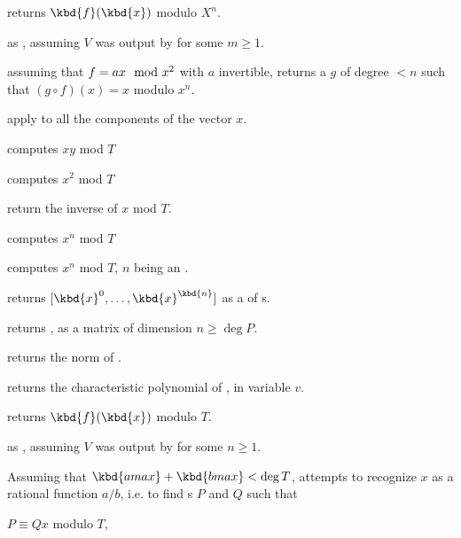 returns $\kbd{f}(\kbd{x})$ modulo
$X^n$.

 as ,
assuming $V$ was output by  for some $m\geq 1$.

 assuming that $f = a\*x \mod{x^2}$
with $a$ invertible, returns a  $g$ of degree $< n$ such that $(g
\circ f)(x) = x$ modulo $x^n$.


 apply 
to all the components of the vector $x$.


 computes $xy$ mod $T$

 computes $x^2$ mod $T$

 return the inverse of $x$ mod $T$.

 computes $x^n$ mod $T$

 computes $x^n$ mod $T$,
$n$ being an .

 returns $[\kbd{x}^0,
\dots, \kbd{x}^\kbd{n}]$ as a  of s.

 returns
, as a matrix of dimension $n \geq \deg P$.

 returns the norm of .

 returns the characteristic
polynomial of , in variable $v$.

 returns $\kbd{f}(\kbd{x})$ modulo
$T$.

 as ,
assuming $V$ was output by  for some $n\geq 1$.

Assuming that $\kbd{amax}+\kbd{bmax}<\deg T$, attempts to recognize $x$ as a
rational function $a/b$, i.e. to find s $P$ and $Q$ such that

\item $P \equiv Q x$ modulo $T$,

